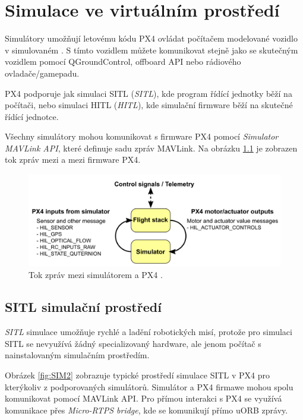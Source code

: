 \chapter{Simulace ve virtuálním prostředí}

Simulátory umožňují letovému kódu PX4 ovládat počítačem modelované vozidlo v simulovaném . S tímto vozidlem můžete komunikovat stejně jako se skutečným vozidlem pomocí QGroundControl, offboard API nebo rádiového ovladače/gamepadu. 

PX4 podporuje jak simulaci \acs{SITL} (\textit{\acl{SITL}}), kde program řídící jednotky běží na počítači, nebo simulaci \acs{HITL} (\textit{\acl{HITL}}), kde simulační firmware běží na skutečné řídící jednotce. \cite{PX4docs}

Všechny simulátory mohou komunikovat s firmware PX4 pomocí \textit{Simulator MAVLink API}, které definuje sadu zpráv MAVLink. Na obrázku \ref{fig:SIM1} je zobrazen tok zpráv mezi  a mezi firmware PX4.

\begin{figure}[!ht]
  \begin{center}
    \includegraphics[scale=0.29]{obrazky/SIM1}
  \end{center}
  \caption[Tok zpráv mezi simulátorem a PX4]{Tok zpráv mezi simulátorem a PX4 \cite{PX4docs}.}
  \label{fig:SIM1}
\end{figure}

\section{SITL simulační prostředí}

\textit{\acl{SITL}} simulace umožňuje rychlé a  ladění robotických misí, protože pro simulaci \acs{SITL} se nevyužívá žádný specializovaný hardware, ale jenom počítač s nainstalovaným simulačním prostředím.

Obrázek \ref{fig:SIM2} zobrazuje typické prostředí simulace SITL v PX4 pro kterýkoliv z podporovaných simulátorů. Simulátor a PX4 firmawe mohou spolu komunikovat pomocí MAVLink \acs{API}. Pro přímou interakci s PX4 se využívá komunikace přes \textit{Micro-RTPS bridge}, kde se komunikují přímo uORB zprávy.

